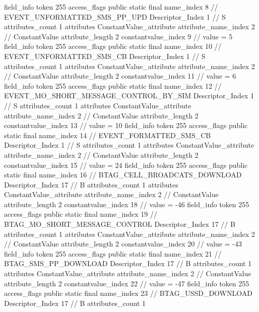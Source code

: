 {{{{{{{				}
				}
			}
			field_info {
				token	255
				access_flags	public static final
				name_index	8		// EVENT_UNFORMATTED_SMS_PP_UPD
				Descriptor_Index	1		// S
				attributes_count	1
				attributes {
				ConstantValue_attribute {
					attribute_name_index	2		// ConstantValue
					attribute_length	2
					constantvalue_index	9		// value = 5
				}
				}
			}
			field_info {
				token	255
				access_flags	public static final
				name_index	10		// EVENT_UNFORMATTED_SMS_CB
				Descriptor_Index	1		// S
				attributes_count	1
				attributes {
				ConstantValue_attribute {
					attribute_name_index	2		// ConstantValue
					attribute_length	2
					constantvalue_index	11		// value = 6
				}
				}
			}
			field_info {
				token	255
				access_flags	public static final
				name_index	12		// EVENT_MO_SHORT_MESSAGE_CONTROL_BY_SIM
				Descriptor_Index	1		// S
				attributes_count	1
				attributes {
				ConstantValue_attribute {
					attribute_name_index	2		// ConstantValue
					attribute_length	2
					constantvalue_index	13		// value = 10
				}
				}
			}
			field_info {
				token	255
				access_flags	public static final
				name_index	14		// EVENT_FORMATTED_SMS_CB
				Descriptor_Index	1		// S
				attributes_count	1
				attributes {
				ConstantValue_attribute {
					attribute_name_index	2		// ConstantValue
					attribute_length	2
					constantvalue_index	15		// value = 24
				}
				}
			}
			field_info {
				token	255
				access_flags	public static final
				name_index	16		// BTAG_CELL_BROADCATS_DOWNLOAD
				Descriptor_Index	17		// B
				attributes_count	1
				attributes {
				ConstantValue_attribute {
					attribute_name_index	2		// ConstantValue
					attribute_length	2
					constantvalue_index	18		// value = -46
				}
				}
			}
			field_info {
				token	255
				access_flags	public static final
				name_index	19		// BTAG_MO_SHORT_MESSAGE_CONTROL
				Descriptor_Index	17		// B
				attributes_count	1
				attributes {
				ConstantValue_attribute {
					attribute_name_index	2		// ConstantValue
					attribute_length	2
					constantvalue_index	20		// value = -43
				}
				}
			}
			field_info {
				token	255
				access_flags	public static final
				name_index	21		// BTAG_SMS_PP_DOWNLOAD
				Descriptor_Index	17		// B
				attributes_count	1
				attributes {
				ConstantValue_attribute {
					attribute_name_index	2		// ConstantValue
					attribute_length	2
					constantvalue_index	22		// value = -47
				}
				}
			}
			field_info {
				token	255
				access_flags	public static final
				name_index	23		// BTAG_USSD_DOWNLOAD
				Descriptor_Index	17		// B
				attributes_count	1
}}}}}
